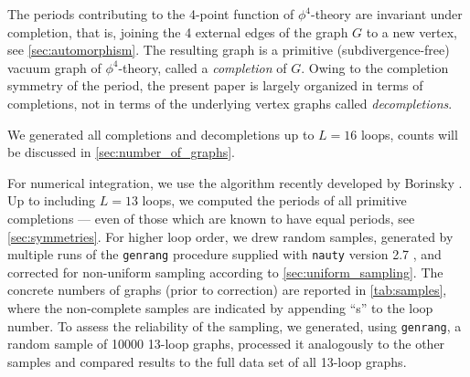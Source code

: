 \documentclass[11pt,a4paper]{article}
\renewcommand{\|}{\rule[-0.4ex]{0.2ex}{1.2em}}
\begin{document}
	The periods contributing to the 4-point function of $\phi^4$-theory   are invariant under  completion, that is, joining the 4 external edges of the graph $G$ to a new vertex, see \cref{sec:automorphism}. The resulting graph is a primitive (subdivergence-free)  vacuum graph  of $\phi^4$-theory, called a \emph{completion} of $G$. Owing to the completion symmetry of the period, the present paper is largely organized in terms of completions, not in terms of the underlying vertex graphs called \emph{decompletions}.
	
	We generated all completions and decompletions up to $L=16$ loops, counts will be discussed in \cref{sec:number_of_graphs}. 

	For numerical integration, we use the algorithm recently developed by Borinsky \cite{borinsky_tropical_2023a}.
	Up to including $L=13$ loops, we computed the periods of all primitive completions --- even of  those which are known to have equal periods, see \cref{sec:symmetries}. For higher loop order, we drew   random samples, generated by multiple runs of the \texttt{genrang} procedure supplied with \texttt{nauty} version 2.7 \cite{mckay_practical_2014}, and corrected for non-uniform sampling according to  \cref{sec:uniform_sampling}. The concrete numbers of graphs (prior to correction) are reported in \cref{tab:samples}, where the non-complete samples are indicated by appending \enquote{s} to the loop number. 
	To assess the reliability of the sampling, we generated, using \texttt{genrang}, a random sample of 10000 13-loop graphs, processed it analogously to the other samples and compared results to the full data set of all 13-loop graphs. 
	
\end{document}
